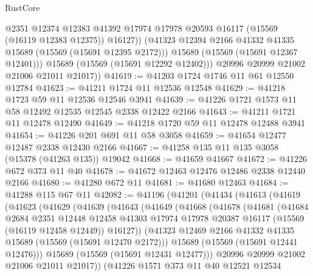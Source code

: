 \begin{lexlean}{RustCore}
\begin{coremodule}
                @2351
                @12374
                @12383
                @41392
                @17974
                @17978
                @20593
                @16117
                (@15569 (@16119 @12383 @12375))
                @16127))
            (@41323 @12394 @2166 @41332 @41335 @15689 (@15569 (@15691 @12395 @2172)))
            @15689
            (@15569 (@15691 @12367 @12401)))
          @15689
          (@15569 (@15691 @12292 @12402)))
        @20996
        @20999
        @21002
        @21006
        @21011
        @21017))
@41619 := @41203 @1724 @1746 @11 @61 @12550 @12784
@41623 := @41211 @1724 @11 @12536 @12548
@41629 := @41218 @1723 @59 @11 @12536 @12546 @3941
@41639 := @41226 @1721 @1573 @11 @58 @12492 @12535 @12545 @2338 @12422 @2166
@41643 := @41211 @1721 @11 @12478 @12490
@41649 := @41218 @1720 @59 @11 @12478 @12488 @3941
@41654 := @41226 @201 @691 @11 @58 @3058
@41659 := @41654 @12477 @12487 @2338 @12430 @2166
@41667 := @41258 @135 @11 @135 @3058 (@15378 (@41263 @135)) @19042
@41668 := @41659 @41667
@41672 := @41226 @672 @373 @11 @40
@41678 := @41672 @12463 @12476 @12486 @2338 @12440 @2166
@41680 := @41280 @672 @11
@41681 := @41680 @12463
@41684 := @41288 @115 @67 @11
@42082 := @41196
    (@41201
      (@41434
        (@41613
          (@41619
            (@41623
              (@41629
                (@41639
                  (@41643
                    (@41649
                      (@41668
                        (@41678
                          (@41681
                            (@41684
                              @2684
                              @2351
                              @12448
                              @12458
                              @41303
                              @17974
                              @17978
                              @20387
                              @16117
                              (@15569 (@16119 @12458 @12449))
                              @16127))
                          (@41323 @12469 @2166 @41332 @41335 @15689 (@15569 (@15691 @12470 @2172)))
                          @15689
                          (@15569 (@15691 @12441 @12476)))
                        @15689
                        (@15569 (@15691 @12431 @12477)))
                      @20996
                      @20999
                      @21002
                      @21006
                      @21011
                      @21017))
                  (@41226
                    @1571
                    @373
                    @11
                    @40
                    @12521
                    @12534

\end{coremodule}
\end{lexlean}
